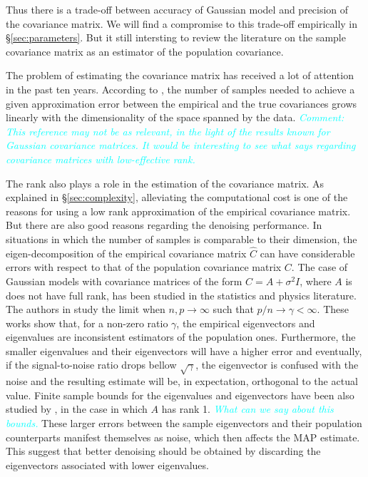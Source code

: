 \documentclass[10pt, journal, twocolumn, final, a4paper]{IEEEtran}
\newcommand{\pa}[1]{\textcolor{cyan}{#1}}
\newcommand{\pcomment}[1]{\textit{\pa{#1}}}
\begin{document}
Thus there is a trade-off between accuracy of Gaussian model and precision of the
covariance matrix. We will find a compromise to this trade-off empirically  in
\S \ref{sec:parameters}. But it still intersting to review the literature 
on the sample covariance matrix as an estimator of the population covariance.

The problem of estimating the covariance matrix has received a lot of attention in the
past ten years.
According to \cite{Vershynin2012}, the number of samples needed to achieve a given approximation
error between the empirical and the true covariances grows linearly with the
dimensionality of the space spanned by the data. 
\pcomment{Comment: This reference may not be as relevant, in the light of the 
results known for Gaussian covariance matrices. It would be interesting to see what 
\cite{bunea2015} says regarding covariance matrices with low-effective rank.}

The rank also plays a role in the estimation of the covariance matrix.
As explained in \S \ref{sec:complexity}, alleviating the computational cost is
one of the reasons for using a low rank approximation of the empirical
covariance matrix. But there are also good reasons regarding the denoising
performance. In situations in which the number of samples 
is comparable to their dimension, the eigen-decomposition of the empirical
covariance matrix $\widehat C$ can have considerable errors with respect to
that of the population covariance matrix $C$. 
%
The case of Gaussian models with covariance matrices of the form $C = A + \sigma^2I$,
where $A$ is does not have full rank, has been studied in the statistics and physics
literature. The authors in \cite{johnstone2009,paul2007,nadler2008} study the
limit when $n,p\to\infty$ such that $p/n\to\gamma < \infty$.
These works show that, for a non-zero ratio $\gamma$, the empirical eigenvectors 
and eigenvalues are inconsistent estimators of the population ones.
Furthermore, the smaller eigenvalues and their eigenvectors will have a higher
error and eventually, if the signal-to-noise ratio drops bellow $\sqrt{\gamma}$, 
the eigenvector is confused with the noise and the resulting estimate will be,
in expectation, orthogonal to the actual value.
Finite sample bounds for the eigenvalues and eigenvectors have been also studied 
by \cite{nadler2008}, in the case in which $A$ has rank 1.
\pcomment{What can we say about this bounds.}
These larger errors between the sample eigenvectors and their population
counterparts manifest themselves as noise, which then affects the MAP estimate.
This suggest that better denoising should be obtained by discarding the
eigenvectors associated with lower eigenvalues.
\end{document}
